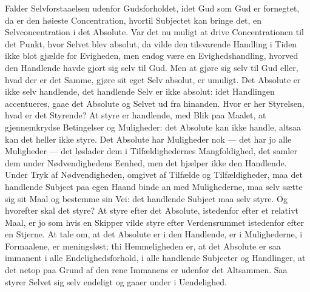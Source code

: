 \documentclass[12pt]{book}
\begin{document}
Falder Selvforstaaelsen udenfor Gudsforholdet, idet Gud som Gud er
fornegtet, da er den høieste Concentration, hvortil Subjectet kan
bringe det, en Selvconcentration i det Absolute. Var det nu muligt
at drive Concentrationen til det Punkt, hvor Selvet blev absolut, da
vilde den tilsvarende Handling i Tiden ikke blot gjælde for
Evigheden, men endog være en Evighedshandling, hvorved den Handlende
havde gjort sig selv til Gud. Men at gjøre sig selv til Gud eller,
hvad der er det Samme, gjøre sit eget Selv absolut, er umuligt. Det
Absolute er ikke selv handlende, det handlende Selv er ikke absolut:
idet Handlingen accentueres, gaae det Absolute og Selvet ud fra
hinanden. Hvor er her Styrelsen, hvad er det Styrende? At styre er
handlende, med Blik paa Maalet, at gjennemkrydse Betingelser og
Muligheder: det Absolute kan ikke handle, altsaa kan det heller ikke
styre. Det Absolute har Muligheder nok --- det har jo alle
Muligheder --- det løslader dem i Tilfældighedernes
Mangfoldighed, det samler dem under Nødvendighedens Eenhed, men det
hjælper ikke den Handlende. Under Tryk af Nødvendigheden, omgivet af
Tilfælde og Tilfældigheder, maa det handlende Subject paa egen Haand
binde an med Mulighederne, maa selv sætte sig sit Maal og bestemme
sin Vei: det handlende Subject maa selv styre. Og hvorefter skal det
styre? At styre efter det Absolute, istedenfor efter et relativt
Maal, er jo som hvis en Skipper vilde styre efter Verdensrummet
istedenfor efter en Stjerne. At tale om, at det Absolute er i den
Handlende, er i Mulighederne, i Formaalene, er meningsløst; thi
Hemmeligheden er, at det Absolute er saa immanent i alle
Endelighedsforhold, i alle handlende Subjecter og Handlinger, at det
netop paa Grund af den rene Immanens er udenfor det Altsammen. Saa
styrer Selvet sig selv endeligt og gaaer under i Uendelighed.
\end{document}
